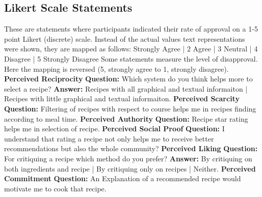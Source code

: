 \subsection{Likert Scale Statements}
These are statements where participants indicated their rate of approval on a 1-5 point Likert (discrete) scale. Instead of the actual values text representations were shown, they are mapped as follows: Strongly Agree | 2 Agree | 3 Neutral | 4 Disagree | 5 Strongly Disagree\newline
Some statements measure the level of disapproval. Here the mapping is reversed (5, strongly agree to 1, strongly disagree).\newline \newline
\textbf{Perceived Reciprocity}\newline 
\textbf{Question:} Which system do you think helps more to select a recipe?\newline
\textbf{Answer:} Recipes with all graphical and textual informaiton | Recipes with little graphical and textual informaiton. \newline \newline
\textbf{Perceived Scarcity}\newline
\textbf{Question:} Filtering of recipes with respect to course helps me in recipes finding according to meal time.\newline \newline
\textbf{Perceived Authority}\newline
\textbf{Question:} Recipe star rating helps me in selection of recipe.\newline \newline
\textbf{Perceived Social Proof}\newline
\textbf{Question:} I understand that rating a recipe not only helps me to receive better recommendations but also the whole community?\newline \newline
\textbf{Perceived Liking}\newline
\textbf{Question:} For critiquing a recipe which method do you prefer?\newline
\textbf{Answer:} By critiquing on both ingredients and recipe | By critiquing only on recipes | Neither. \newline
\textbf{Perceived Commitment}\newline
\textbf{Question:} An Explanation of a recommended recipe would motivate me to cook that recipe.\newline \newline
